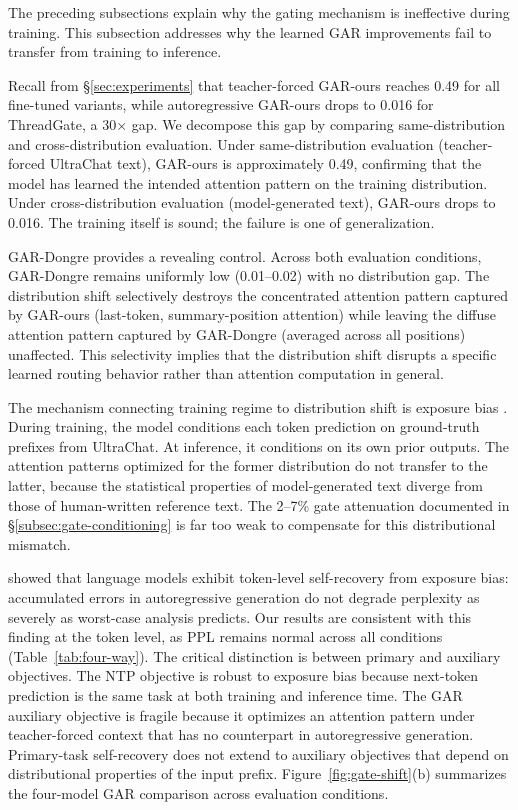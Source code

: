 The preceding subsections explain why the gating mechanism is ineffective during training. This subsection addresses why the learned GAR improvements fail to transfer from training to inference.

Recall from \S\ref{sec:experiments} that teacher-forced GAR-ours reaches 0.49 for all fine-tuned variants, while autoregressive GAR-ours drops to 0.016 for ThreadGate, a 30$\times$ gap. We decompose this gap by comparing same-distribution and cross-distribution evaluation. Under same-distribution evaluation (teacher-forced UltraChat text), GAR-ours is approximately 0.49, confirming that the model has learned the intended attention pattern on the training distribution. Under cross-distribution evaluation (model-generated text), GAR-ours drops to 0.016. The training itself is sound; the failure is one of generalization.

GAR-Dongre provides a revealing control. Across both evaluation conditions, GAR-Dongre remains uniformly low (0.01--0.02) with no distribution gap. The distribution shift selectively destroys the concentrated attention pattern captured by GAR-ours (last-token, summary-position attention) while leaving the diffuse attention pattern captured by GAR-Dongre (averaged across all positions) unaffected. This selectivity implies that the distribution shift disrupts a specific learned routing behavior rather than attention computation in general.

The mechanism connecting training regime to distribution shift is exposure bias \citep{bengio2015scheduled}. During training, the model conditions each token prediction on ground-truth prefixes from UltraChat. At inference, it conditions on its own prior outputs. The attention patterns optimized for the former distribution do not transfer to the latter, because the statistical properties of model-generated text diverge from those of human-written reference text. The 2--7\% gate attenuation documented in \S\ref{subsec:gate-conditioning} is far too weak to compensate for this distributional mismatch.

\citet{he2019exposure} showed that language models exhibit token-level self-recovery from exposure bias: accumulated errors in autoregressive generation do not degrade perplexity as severely as worst-case analysis predicts. Our results are consistent with this finding at the token level, as PPL remains normal across all conditions (Table~\ref{tab:four-way}). The critical distinction is between primary and auxiliary objectives. The NTP objective is robust to exposure bias because next-token prediction is the same task at both training and inference time. The GAR auxiliary objective is fragile because it optimizes an attention pattern under teacher-forced context that has no counterpart in autoregressive generation. Primary-task self-recovery does not extend to auxiliary objectives that depend on distributional properties of the input prefix. Figure~\ref{fig:gate-shift}(b) summarizes the four-model GAR comparison across evaluation conditions.